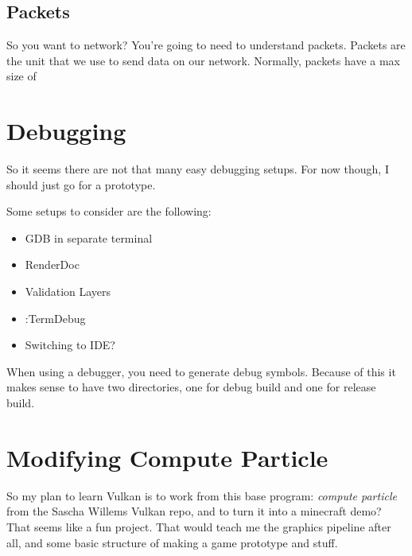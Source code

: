 \documentclass{article}
\begin{document}
\subsection*{Packets}
\par So you want to network? You're going to need to understand
packets. Packets are the unit that we use to send data on our
network. Normally, packets have a max size of


\section*{Debugging}
\par So it seems there are not that many easy debugging setups. For
now though, I should just go for a prototype.

\par Some setups to consider are the following:
\begin{itemize}
\item GDB in separate terminal
\item RenderDoc
\item Validation Layers
\item :TermDebug
\item Switching to IDE?
\end{itemize}

\par When using a debugger, you need to generate debug symbols.
Because of this it makes sense to have two directories, one for debug
build and one for release build.


\section*{Modifying Compute
Particle}
\par So my plan to learn Vulkan is to work from this base program:
\textit{compute particle} from the Sascha Willems Vulkan repo, and to
turn it into a minecraft demo? That seems like a fun project. That
would teach me the graphics pipeline after all, and some basic
structure of making a game prototype and stuff.
\end{document}
